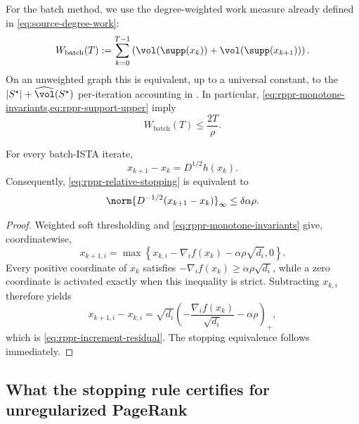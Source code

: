 For the batch method, we use the degree-weighted work measure already defined
in \cref{eq:source-degree-work}:
\begin{equation}
    W_{\mathrm{batch}}(T)
    :=
    \sum_{k=0}^{T-1}
    \left(
        \vol(\supp(x_k))+\vol(\supp(x_{k+1}))
    \right).
    \label{eq:rppr-batch-work}
\end{equation}
On an unweighted graph this is equivalent, up to a universal constant, to the
\(|S^\star|+\widehat{\vol}(S^\star)\) per-iteration accounting in
\citet[Theorem~3]{fountoulakis2019variational}.  In particular,
\cref{eq:rppr-monotone-invariants,eq:rppr-support-upper} imply
\begin{equation}
    W_{\mathrm{batch}}(T)\leq\frac{2T}{\rho}.
    \label{eq:rppr-work-from-iterations}
\end{equation}

\begin{lemma}
\label{lem:rppr-increment-residual}
For every batch-ISTA iterate,
\begin{equation}
    x_{k+1}-x_k=D^{1/2}h(x_k).
    \label{eq:rppr-increment-residual}
\end{equation}
Consequently, \cref{eq:rppr-relative-stopping} is equivalent to
\begin{equation}
    \norm{D^{-1/2}(x_{k+1}-x_k)}_\infty
    \leq\delta\alpha\rho.
    \label{eq:rppr-step-stopping}
\end{equation}
\end{lemma}

\begin{proof}
Weighted soft thresholding and
\cref{eq:rppr-monotone-invariants} give, coordinatewise,
\[
    x_{k+1,i}
    =
    \max\left\{
        x_{k,i}-\nabla_i f(x_k)-\alpha\rho\sqrt{d_i},0
    \right\}.
\]
Every positive coordinate of \(x_k\) satisfies
\(-\nabla_i f(x_k)\geq\alpha\rho\sqrt{d_i}\), while a zero coordinate is
activated exactly when this inequality is strict.  Subtracting \(x_{k,i}\)
therefore yields
\[
    x_{k+1,i}-x_{k,i}
    =
    \sqrt{d_i}
    \left(
        -\frac{\nabla_i f(x_k)}{\sqrt{d_i}}-\alpha\rho
    \right)_+,
\]
which is \cref{eq:rppr-increment-residual}.  The stopping equivalence follows
immediately.
\end{proof}

\subsection{What the stopping rule certifies for unregularized PageRank}
\label{subsec:rppr-ppr-certificate}

